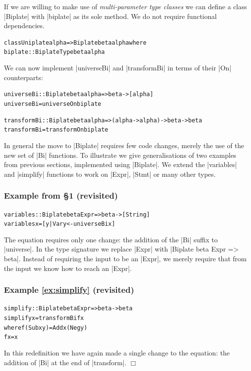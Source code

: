 \documentclass[preprint]{sigplanconf}
\let\cite=\citep
\newcommand{\noexample}{\hfill$\Box$}
\newenvironment{code}{\begin{alltt}\small}{\end{alltt}}
\newenvironment{revisit}[1]{\subsubsection*{Example #1 (revisited)}}{\noexample}
\newcommand{\ignore}{}
\begin{document}
If we are willing to make use of \textit{multi-parameter type classes} \cite{jones:mptc} we can define a class |Biplate| with |biplate| as its sole method. We do not require functional dependencies.

\begin{code}
class  Uniplate alpha => Biplate beta alpha where
       biplate :: BiplateType beta alpha
\end{code}

We can now implement |universeBi| and |transformBi| in terms of their |On| counterparts:

\begin{code}
universeBi :: Biplate beta alpha => beta -> [alpha]
universeBi = universeOn biplate

transformBi :: Biplate beta alpha => (alpha -> alpha) -> beta -> beta
transformBi = transformOn biplate
\end{code}

In general the move to |Biplate| requires few code changes, merely the use of the new set of |Bi| functions. To illustrate we give generalisations of two examples from previous sections, implemented using |Biplate|. We extend the |variables| and |simplify| functions to work on |Expr|, |Stmt| or many other types.

\subsubsection*{Example from \S1 (revisited)}
\begin{code}
variables :: Biplate beta Expr => beta -> [String]
variables x = [y | Var y <- universeBi x]
\end{code}

The equation requires only one change: the addition of the |Bi| suffix to |universe|. In the type signature we replace |Expr| with \ignore|Biplate beta Expr => beta|. Instead of requiring the input to be an |Expr|, we merely require that from the input we know how to reach an |Expr|.
\endexample

\begin{revisit}{\ref{ex:simplify}}
\begin{code}
simplify :: Biplate beta Expr => beta -> beta
simplify x = transformBi f x
    where  f (Sub x y)  = Add x (Neg y)
           f x          = x
\end{code}

In this redefinition we have again made a single change to the equation: the addition of |Bi| at the end of |transform|.
\end{revisit}
\end{document}

